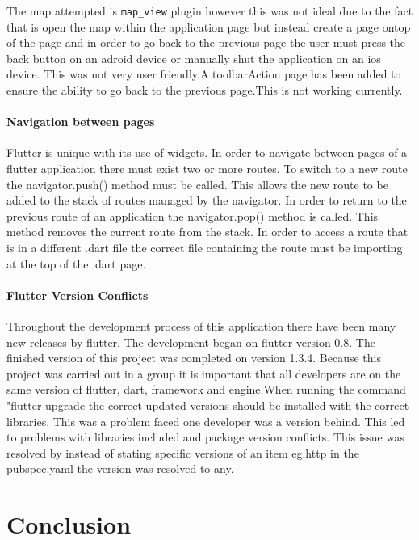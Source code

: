 The map attempted is \texttt{map\_view} plugin however this was not ideal due to the fact that is open the map within the application page but instead create a page ontop of the page and in order to go back to the previous page the user must press the back button on an adroid device or manually shut the application on an ios device. This was not very user friendly.A toolbarAction page has been added to ensure the ability to go back to the previous page.This is not working currently.

\subsubsection{Navigation between pages}
Flutter is unique with its use of widgets. In order to navigate between pages of a flutter application there must exist two or more routes. To switch to a new route the navigator.push() method must be called. This allows the new route to be added to the stack of routes managed by the navigator. In order to return to the previous route of an application the navigator.pop() method is called. This method removes the current route from the stack. In order to access a route that is in a different .dart file the correct file containing the route must be importing at the top of the .dart page.

\subsubsection{Flutter Version Conflicts}
Throughout the development process of this application there have been many new releases by flutter. The development began on flutter version 0.8. The finished version of this project was completed on version 1.3.4. Because this project was carried out in a group it is important that all developers are on the same version of flutter, dart, framework and engine.When running the command "flutter upgrade the correct updated versions should be installed with the correct libraries. This was a problem faced one developer was a version behind. This led to problems with libraries included and package version conflicts. This issue was resolved by instead of stating specific versions of an item eg.http in the pubspec.yaml the version was resolved to any.



\chapter{Conclusion}

